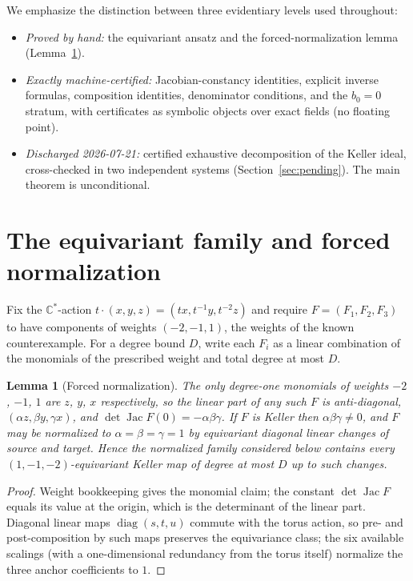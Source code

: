 \documentclass[11pt]{article}
\newtheorem{lemma}[theorem]{Lemma}
\newcommand{\C}{\mathbb{C}}
\begin{document}
We emphasize the distinction between three evidentiary levels used throughout:
\begin{itemize}
\item[\textbf{L1}] \emph{Proved by hand:} the equivariant ansatz and the
forced-normalization lemma (Lemma~\ref{lem:normal}).
\item[\textbf{L2}] \emph{Exactly machine-certified:} Jacobian-constancy
identities, explicit inverse formulas, composition identities, denominator
conditions, and the $b_0=0$ stratum, with certificates as symbolic objects over
exact fields (no floating point).
\item[\textbf{L3}] \emph{Discharged 2026-07-21:} certified exhaustive
decomposition of the Keller ideal, cross-checked in two independent systems
(Section~\ref{sec:pending}). The main theorem is unconditional.
\end{itemize}

\section{The equivariant family and forced normalization}

Fix the $\C^{*}$-action $t\cdot(x,y,z)=(tx,t^{-1}y,t^{-2}z)$ and require
$F=(F_1,F_2,F_3)$ to have components of weights $(-2,-1,1)$, the weights of the
known counterexample. For a degree bound $D$, write each $F_i$ as a linear
combination of the monomials of the prescribed weight and total degree at most
$D$.

\begin{lemma}[Forced normalization]\label{lem:normal}
The only degree-one monomials of weights $-2$, $-1$, $1$ are $z$, $y$, $x$
respectively, so the linear part of any such $F$ is anti-diagonal,
$(\alpha z,\beta y,\gamma x)$, and $\det\operatorname{Jac}F(0)=-\alpha\beta\gamma$.
If $F$ is Keller then $\alpha\beta\gamma\neq0$, and $F$ may be normalized to
$\alpha=\beta=\gamma=1$ by equivariant diagonal linear changes of source and
target. Hence the normalized family considered below contains every
$(1,-1,-2)$-equivariant Keller map of degree at most $D$ up to such changes.
\end{lemma}

\begin{proof}
Weight bookkeeping gives the monomial claim; the constant $\det\operatorname{Jac}F$
equals its value at the origin, which is the determinant of the linear part.
Diagonal linear maps $\operatorname{diag}(s,t,u)$ commute with the torus action,
so pre- and post-composition by such maps preserves the equivariance class;
the six available scalings (with a one-dimensional redundancy from the torus
itself) normalize the three anchor coefficients to $1$.
\end{proof}
\end{document}
